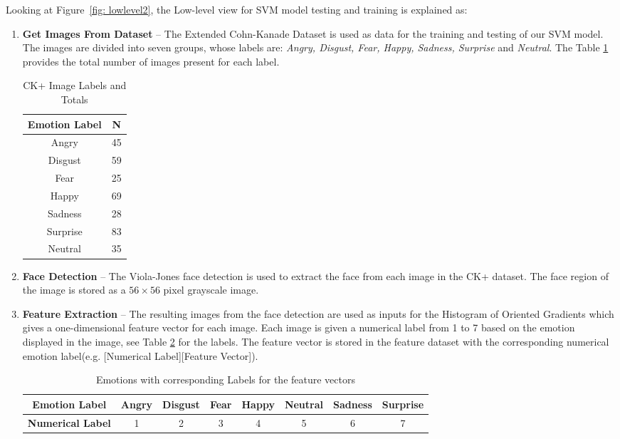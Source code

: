 Looking at Figure~\ref{fig: lowlevel2}, the Low-level view for SVM model testing and training is explained as:

\begin{enumerate}
  \item \textbf{Get Images From Dataset} -- The Extended Cohn-Kanade Dataset \citep{ck} is used as data for the training and testing of our SVM model. The images are divided into seven groups, whose labels are: \textit{Angry, Disgust, Fear, Happy, Sadness, Surprise} and \textit{Neutral}. The Table \ref{table:1} provides the total number of images present for each label.

\begin{table}[H]
\centering
\begin{tabular}{ |c||c|}	
	\hline
	\textbf{Emotion Label} & \textbf{N}  \\
	\hline 
	Angry & 45 \\ 
	Disgust & 59 \\ 
	Fear & 25 \\ 
	Happy & 69 \\ 
	Sadness & 28 \\ 
	Surprise & 83 \\  
	Neutral & 35 \\
	\hline  
\end{tabular}
\caption{CK+ Image Labels and Totals}
\label{table:1}
\end{table}

  \item \textbf{Face Detection} -- The Viola-Jones face detection is used to extract the face from each image in the CK+ dataset. The face region of the image is stored as a $56 \times 56$ pixel grayscale image. 
  
  \item \textbf{Feature Extraction} -- The resulting images from the face detection are used as inputs for the Histogram of Oriented Gradients which gives a one-dimensional feature vector for each image. Each image is given a numerical label from 1 to 7 based on the emotion displayed in the image, see Table \ref{table:22} for the labels. The feature vector is stored in the feature dataset with the corresponding numerical emotion label(e.g. [Numerical Label][Feature Vector]). 
\begin{table}[H]
\centering
\begin{tabular}{ |c||c|c|c|c|c|c|c|}
	\hline
	\textbf{Emotion Label}  & Angry & Disgust & Fear & Happy & Neutral & Sadness & Surprise \\ 
	\hline
	\textbf{Numerical Label} & 1 & 2 & 3 & 4 & 5 & 6 & 7   \\ 
	\hline
\end{tabular}   
\caption{Emotions with corresponding Labels for the feature vectors}
\label{table:22}
\end{table}


\end{enumerate}
